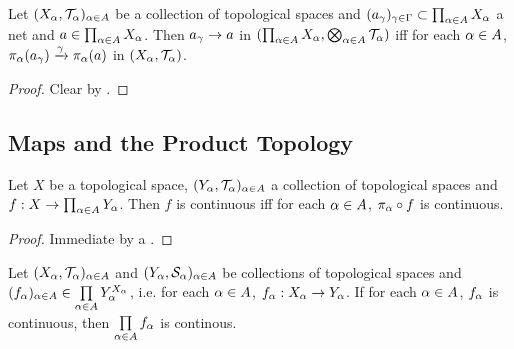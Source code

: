 \documentclass{book}
\begin{document}
	\begin{ex} 
		Let $(X_{\alpha}, \mathcal{T}_{\alpha})_{\alpha \in A}$ be a collection of topological spaces and $(a_{\gamma})_{\gamma \in \Gamma} \subset \prod_{\alpha \in A} X_{\alpha}$ a net and $a \in \prod_{\alpha \in A} X_{\alpha}$. Then $a_{\gamma} \rightarrow a$ in $(\prod_{\alpha \in A} X_{\alpha}, \bigotimes_{\alpha \in A} \mathcal{T}_{\alpha})$ iff for each $\alpha \in A$, $\pi_{\alpha}(a_{\gamma}) \xrightarrow{\gamma} \pi_{\alpha}(a)$ in $(X_{\alpha}, \mathcal{T}_{\alpha})$. 
	\end{ex}

	\begin{proof} 
		Clear by .
	\end{proof}




















	
	
	
	
	
	
	
	
	\subsection{Maps and the Product Topology}
	
	\begin{ex}  
		Let $X$ be a topological space, $(Y_{\alpha}, \mathcal{T}_{\alpha})_{\alpha \in A}$ a collection of topological spaces and $f: X \rightarrow \prod_{\alpha \in A}Y_{\alpha}$. Then $f$ is continuous iff for each $\alpha \in A$, $\pi_{\alpha} \circ f$ is continuous.
	\end{ex}

	\begin{proof}
		Immediate by a .
	\end{proof}
	
	\begin{ex} 
		Let $(X_{\alpha}, \mathcal{T}_{\alpha})_{\alpha \in A}$ and $(Y_{\alpha}, \mathcal{S}_{\alpha})_{\alpha \in A}$ be collections of topological spaces and $(f_{\alpha})_{\alpha \in A} \in \prod\limits_{\alpha \in A} Y_{\alpha}^{X_{\alpha}}$, i.e. for each $\alpha \in A$, $f_{\alpha}:X_{\alpha} \rightarrow Y_{\alpha}$. If for each $\alpha \in A$, $f_{\alpha}$ is continuous, then $\prod\limits_{\alpha \in A} f_{\alpha}$ is continous.
	\end{ex}
\end{document}
